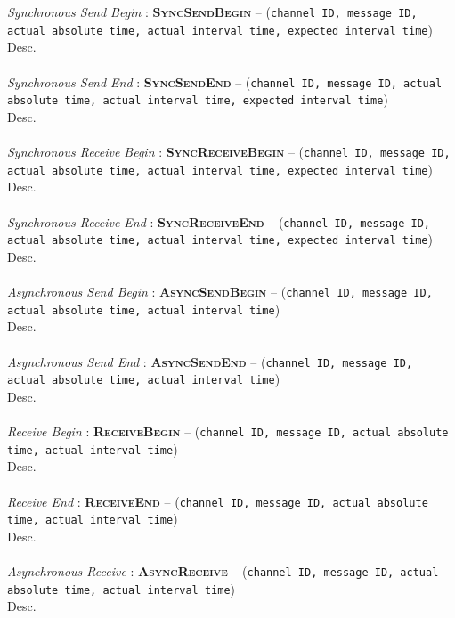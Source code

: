 \textit{Synchronous Send Begin} : \textbf{\textsc{SyncSendBegin}} -- (\texttt{channel ID, message ID, actual absolute time, actual interval time, expected interval time})\\
Desc.
\\
\\
\textit{Synchronous Send End} : \textbf{\textsc{SyncSendEnd}} -- (\texttt{channel ID, message ID, actual absolute time, actual interval time, expected interval time})\\
Desc.
\\
\\
\textit{Synchronous Receive Begin} : \textbf{\textsc{SyncReceiveBegin}} -- (\texttt{channel ID, message ID, actual absolute time, actual interval time, expected interval time})\\
Desc.
\\
\\
\textit{Synchronous Receive End} : \textbf{\textsc{SyncReceiveEnd}} -- (\texttt{channel ID, message ID, actual absolute time, actual interval time, expected interval time})\\
Desc.
\\
\\
\textit{Asynchronous Send Begin} : \textbf{\textsc{AsyncSendBegin}} -- (\texttt{channel ID, message ID, actual absolute time, actual interval time})\\
Desc.
\\
\\
\textit{Asynchronous Send End} : \textbf{\textsc{AsyncSendEnd}} -- (\texttt{channel ID, message ID, actual absolute time, actual interval time})\\
Desc.
\\
\\
\textit{Receive Begin} : \textbf{\textsc{ReceiveBegin}} -- (\texttt{channel ID, message ID, actual absolute time, actual interval time})\\
Desc.
\\
\\
\textit{Receive End} : \textbf{\textsc{ReceiveEnd}} -- (\texttt{channel ID, message ID, actual absolute time, actual interval time})\\
Desc.
\\
\\
\textit{Asynchronous Receive} : \textbf{\textsc{AsyncReceive}} -- (\texttt{channel ID, message ID, actual absolute time, actual interval time})\\
Desc.
\\
\\


